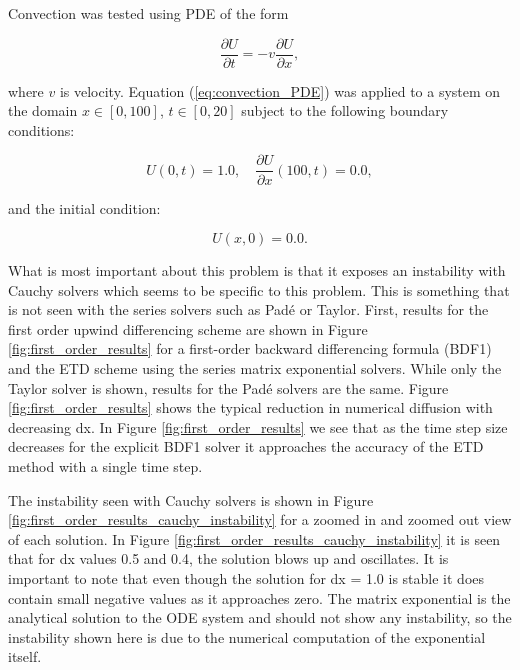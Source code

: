 Convection was tested using PDE of the form

\begin{equation}
    \frac{\partial U}{\partial t} = -v\frac{\partial U}{\partial x},
    \label{eq:convection_PDE}
\end{equation}

\noindent where $v$ is velocity. Equation (\ref{eq:convection_PDE}) was applied to a system on the domain $x \in [0, 100]$, $t \in [0, 20]$ subject to the following boundary conditions:

\begin{equation}
    U(0,t) = 1.0, \quad\frac{\partial U}{\partial x}(100, t) = 0.0,
\end{equation}

\noindent and the initial condition:

\begin{equation}
    U(x,0) = 0.0.
\end{equation}

What is most important about this problem is that it exposes an instability with Cauchy solvers which seems to be specific to this problem. This is something that is not seen with the series solvers such as Pad\'e or Taylor. First, results for the first order upwind differencing scheme are shown in Figure \ref{fig:first_order_results}  for a first-order backward differencing formula (BDF1) and the ETD scheme using the series matrix exponential solvers. While only the Taylor solver is shown, results for the Pad\'e solvers are the same. Figure \ref{fig:first_order_results} shows the typical reduction in numerical diffusion with decreasing dx. In Figure \ref{fig:first_order_results} we see that as the time step size decreases for the explicit BDF1 solver it approaches the accuracy of the ETD method with a single time step. 

The instability seen with Cauchy solvers is shown in Figure \ref{fig:first_order_results_cauchy_instability} for a zoomed in and zoomed out view of each solution. In Figure \ref{fig:first_order_results_cauchy_instability} it is seen that for dx values 0.5 and 0.4, the solution blows up and oscillates. It is important to note that even though the solution for dx = 1.0 is stable it does contain small negative values as it approaches zero. The matrix exponential is the analytical solution to the ODE system and should not show any instability, so the instability shown here is due to the numerical computation of the exponential itself. 

\clearpage

